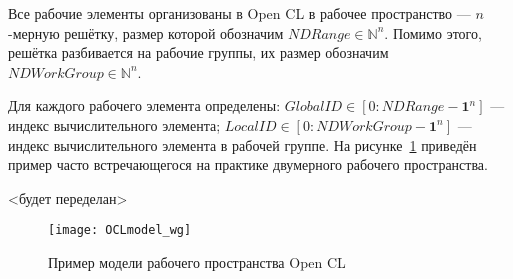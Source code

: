 

Все рабочие элементы организованы в Open CL в рабочее пространство ---
$n$-мерную решётку,  
размер которой обозначим $NDRange \in \mathbb {N}^n$.
Помимо этого, %
решётка разбивается на %
рабочие группы, %
их размер обозначим $NDWorkGroup \in \mathbb {N}^n$. 

Для каждого рабочего элемента %
определены:  
$GlobalID \in [0: NDRange - \mathbf{1}^n]$ %
--- индекс вычислительного элемента; %
$LocalID \in [0: NDWorkGroup - \mathbf{1}^n]$ ---
индекс вычислительного элемента в рабочей группе.
На рисунке~\ref{fig:OCL_wg} приведён пример
часто встречающегося на практике двумерного рабочего пространства.

<будет переделан>
\begin{figure}[h!]
  \centering
  \texttt{[image: OCLmodel\_wg]} 
  \caption{Пример модели рабочего пространства Open CL}
  \label{fig:OCL_wg}
\end{figure}
\FloatBarrier





